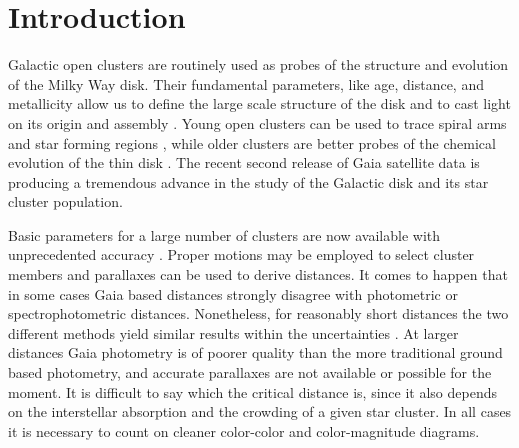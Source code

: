 \documentclass{aa}
\begin{document}
\section{Introduction}

Galactic open clusters are routinely used as probes of the structure and
evolution of the Milky Way disk. Their fundamental parameters, like age,
distance, and metallicity allow us to define the large scale structure of the
disk and to cast light on its origin and assembly \citep{Janes_1982,
2018A&A...618A..93C}. Young open clusters can be used to trace spiral
arms and star forming regions \citep{Vazquez2008}, while older clusters are
better probes of the chemical evolution of the thin disk
\citep{2009yCat..35120063M}. The recent second release of Gaia satellite data
\citep{GaiaDR2_2018} is producing a tremendous advance in the study of the
Galactic disk and its star cluster population.

Basic parameters for a large number of clusters are now available with
unprecedented accuracy \citep{2018A&A...618A..93C}. Proper motions may be
employed to select cluster members and parallaxes can be used to derive
distances. It comes to happen that in some cases Gaia based distances strongly
disagree with photometric or spectrophotometric distances. Nonetheless, for
reasonably short distances the two different methods yield similar results
within the uncertainties \citep{2018A&A...618A..93C}. At larger distances Gaia
photometry is of poorer quality than the more traditional ground based
photometry, and accurate parallaxes are not available or possible for the
moment. It is difficult to say which the critical distance is, since it also
depends on the interstellar absorption and the crowding of a given star cluster.
In all cases it is necessary to count on cleaner color-color and color-magnitude
diagrams.
\end{document}
